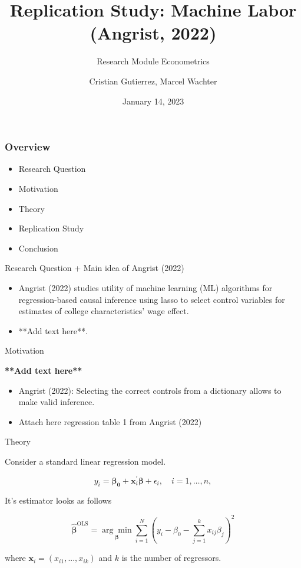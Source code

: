 \documentclass{beamer}
\title{Replication Study: Machine Labor (Angrist, 2022)}
\subtitle {Research Module Econometrics}
\author{Cristian Gutierrez, Marcel Wachter}
\date{January 14, 2023}
\begin{document}
\maketitle

\begin{frame}
\frametitle{Overview} 

\begin{itemize}
    

\item Research Question
\item Motivation
\item Theory
\item Replication Study
\item Conclusion
\end{itemize}
\end{frame}


\begin{frame} {Research Question + Main idea of Angrist (2022)}
\begin{itemize}

\item  Angrist (2022) studies utility of machine learning (ML) algorithms for regression-based causal inference using lasso to select control variables for estimates of college characteristics' wage effect.
\item **Add text here**.
\end{itemize}

\end{frame}






\begin{frame}{Motivation}

\flushleft \textbf{**Add text here**}
\vspace{4mm}
\begin{itemize}
    \item Angrist (2022): Selecting the correct controls from a dictionary allows to make valid inference.
    \item Attach here regression table 1 from Angrist (2022)
\end{itemize}

\end{frame}


\begin{frame}{Theory}
\begin{flushleft}
\item Consider a standard linear regression model. 
\end{flushleft}
\[
    y_i=\boldsymbol{\beta_0} +\mathbf{x}_i^\prime \boldsymbol{\beta}+\epsilon_i, \quad i = 1, \ldots, n,
    \tag{1}
\]
\begin{flushleft}
It's estimator looks as follows
\end{flushleft}
\[
\hat{\boldsymbol{\beta}}^{\text{OLS}}=\underset{\boldsymbol{\beta}}{\arg \min}\sum_{i=1}^N (y_i-\beta_0-\sum_{j=1}^k x_{i j}\beta_j)^2
    \tag{2}
\]
\begin{flushleft}
where $\mathbf{x}_i=(x_{i1}, ..., x_{ik})$ and $k$ is the number of regressors.
\end{flushleft}
\end{frame}
\end{document}
